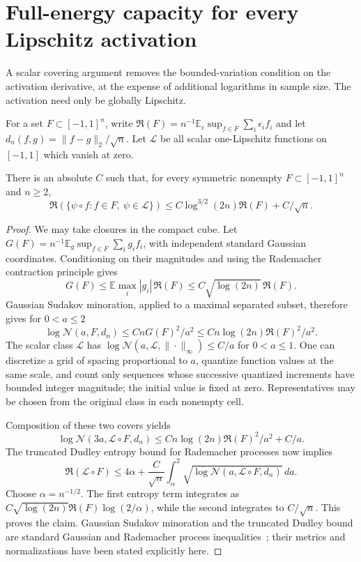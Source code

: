\section{Full-energy capacity for every Lipschitz activation}
\label{sec:all-lipschitz-full-energy}
A scalar covering argument removes the bounded-variation condition on the
activation derivative, at the expense of additional logarithms in sample
size. The activation need only be globally Lipschitz.

For a set $F\subset[-1,1]^n$, write
$\mathfrak R(F)=n^{-1}\mathbb E_\epsilon\sup_{f\in F}\sum_i\epsilon_i f_i$
and let $d_n(f,g)=\|f-g\|_2/\sqrt n$. Let $\mathcal L$ be all scalar
one-Lipschitz functions on $[-1,1]$ which vanish at zero.

\begin{lemma}
\label{lem:unknown-link}
There is an absolute $C$ such that, for every symmetric nonempty
$F\subset[-1,1]^n$ and $n\ge2$,
\[
 \mathfrak R(\{\psi\circ f:f\in F,\ \psi\in\mathcal L\})
 \le C\log^{3/2}(2n)\mathfrak R(F)+C/\sqrt n.
\]
\end{lemma}
\begin{proof}
We may take closures in the compact cube. Let
$G(F)=n^{-1}\mathbb E_g\sup_{f\in F}\sum_i g_i f_i$, with independent
standard Gaussian coordinates. Conditioning on their magnitudes and
using the Rademacher contraction principle gives
\[
 G(F)\le\mathbb E\max_i|g_i|\,\mathfrak R(F)
       \le C\sqrt{\log(2n)}\,\mathfrak R(F).
\]
Gaussian Sudakov minoration, applied to a maximal separated subset,
therefore gives for $0<a\le2$
\[
 \log\mathcal N(a,F,d_n)
 \le CnG(F)^2/a^2
 \le Cn\log(2n)\mathfrak R(F)^2/a^2.
\]
The scalar class $\mathcal L$ has
$\log\mathcal N(a,\mathcal L,\|\cdot\|_\infty)\le C/a$ for
$0<a\le1$. One can discretize a grid of spacing proportional to $a$,
quantize function values at the same scale, and count only sequences
whose successive quantized increments have bounded integer magnitude;
the initial value is fixed at zero. Representatives may be chosen from
the original class in each nonempty cell.

Composition of these two covers yields
\[
 \log\mathcal N(3a,\mathcal L\circ F,d_n)
 \le Cn\log(2n)\mathfrak R(F)^2/a^2+C/a.
\]
The truncated Dudley entropy bound for Rademacher processes now implies
\[
 \mathfrak R(\mathcal L\circ F)
 \le4\alpha+\frac C{\sqrt n}\int_\alpha^2
          \sqrt{\log\mathcal N(a,\mathcal L\circ F,d_n)}\,da.
\]
Choose $\alpha=n^{-1/2}$. The first entropy term integrates as
$C\sqrt{\log(2n)}\mathfrak R(F)\log(2/\alpha)$, while the second
integrates to $C/\sqrt n$. This proves the claim. Gaussian Sudakov
minoration and the truncated Dudley bound are standard Gaussian and
Rademacher process inequalities~\cite{talagrand}; their metrics and normalizations have
been stated explicitly here.
\end{proof}

